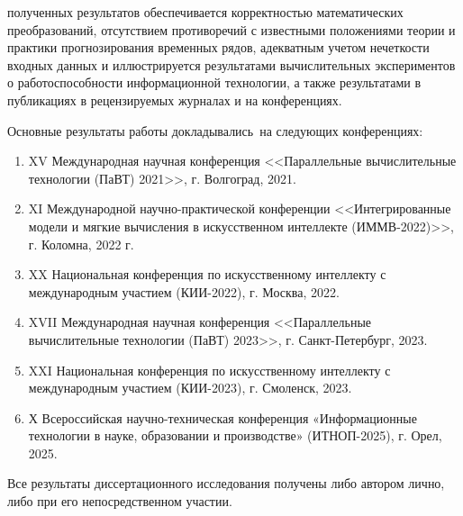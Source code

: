 {\reliability} полученных результатов обеспечивается корректностью математических преобразований, отсутствием противоречий с известными положениями теории и практики прогнозирования временных рядов, адекватным учетом нечеткости входных данных и иллюстрируется результатами вычислительных экспериментов о работоспособности информационной технологии, а также результатами в публикациях в рецензируемых журналах и на конференциях.

{\probation}
Основные результаты работы докладывались~на следующих конференциях:
\begin{enumerate}
	\item XV Международная научная конференция <<Параллельные вычислительные технологии (ПаВТ) 2021>>, г. Волгоград, 2021.
	\item XI Международной научно-практической конференции <<Интегрированные модели и мягкие вычисления в искусственном интеллекте (ИММВ-2022)>>, г. Коломна, 2022 г.
	\item XX Национальная конференция по искусственному интеллекту с международным участием (КИИ-2022), г. Москва, 2022.
	\item XVII Международная научная конференция <<Параллельные вычислительные технологии (ПаВТ) 2023>>, г. Санкт-Петербург, 2023.
	\item XXI Национальная конференция по искусственному интеллекту с международным участием (КИИ-2023), г. Смоленск, 2023.
	\item Х Всероссийская научно-техническая конференция «Информационные технологии в науке, образовании и производстве» (ИТНОП-2025), г. Орел, 2025.
\end{enumerate}

{\contribution} Все результаты диссертационного исследования получены либо автором лично, либо при его непосредственном участии.

